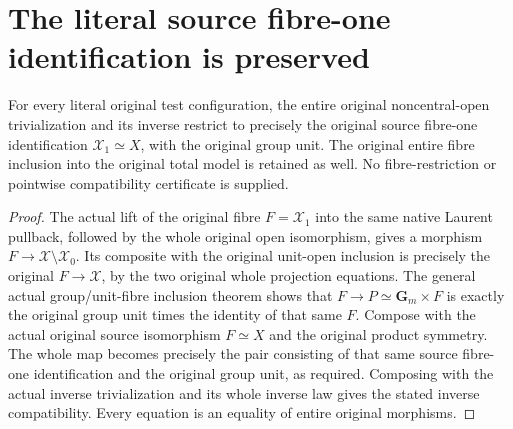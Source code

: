 \section{The literal source fibre-one identification is preserved}
\label{sec:native-test-configuration-fibre-one-compatibility}

\begin{theorem}
\label{thm:native-test-configuration-fibre-one-compatibility}
\leanok
{}
For every literal original test configuration, the entire
original noncentral-open trivialization and its inverse
restrict to precisely the original source fibre-one
identification $\mathcal X_1\simeq X$, with the original
group unit. The original entire fibre inclusion into the
original total model is retained as well. No fibre-restriction
or pointwise compatibility certificate is supplied.
\end{theorem}

\begin{proof}
The actual lift of the original fibre $F=\mathcal X_1$ into
the same native Laurent pullback, followed by the whole
original open isomorphism, gives a morphism $F\to\mathcal X\setminus
\mathcal X_0$. Its composite with the original unit-open
inclusion is precisely the original $F\to\mathcal X$,
by the two original whole projection equations.
The general actual group/unit-fibre inclusion theorem
shows that $F\to P\simeq\mathbf G_m\times F$ is exactly
the original group unit times the identity of that same $F$.
Compose with the actual original source isomorphism
$F\simeq X$ and the original product symmetry. The whole
map becomes precisely the pair consisting of that same
source fibre-one identification and the original group unit,
as required. Composing with the actual inverse trivialization
and its whole inverse law gives the stated inverse compatibility.
Every equation is an equality of entire original morphisms.
\end{proof}
